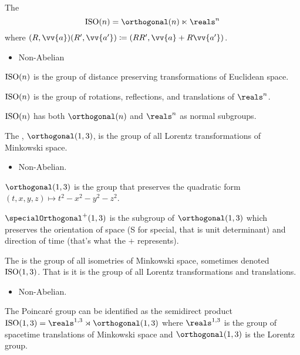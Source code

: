 \begin{dfn}{}{}
    The 
    \begin{equation}
        \ISO(n) = \orthogonal(n) \ltimes \reals^n
    \end{equation}
    where \((R, \vv{a}) (R', \vv{a'}) \coloneqq (RR', \vv{a} + R\vv{a'})\).
    \begin{multicols}{2}
        \begin{itemize}
            \item Non-Abelian
        \end{itemize}
    \end{multicols}
    \(\operatorname{ISO}(n)\) is the group of distance preserving transformations of Euclidean space.
    
    \(\operatorname{ISO}(n)\) is the group of rotations, reflections, and translations of \(\reals^n\).
    
    \(\operatorname{ISO}(n)\) has both \(\orthogonal(n)\) and \(\reals^n\) as normal subgroups.
\end{dfn}

\begin{dfn}{}{}
    The , \(\orthogonal(1, 3)\), is the group of all Lorentz transformations of Minkowski space.
    \begin{multicols}{2}
        \begin{itemize}
            \item Non-Abelian.
        \end{itemize}
    \end{multicols}

    \(\orthogonal(1, 3)\) is the group that preserves the quadratic form \((t, x, y, z) \mapsto t^2 - x^2 - y^2 - z^2\).
    
    \(\specialOrthogonal^+(1, 3)\) is the subgroup of \(\orthogonal(1, 3)\) which preserves the orientation of space (S for special, that is unit determinant) and direction of time (that's what the \(+\) represents).
\end{dfn}

\begin{dfn}{}{}
    The  is the group of all isometries of Minkowski space, sometimes denoted \(\operatorname{ISO}(1, 3)\).
    That is it is the group of all Lorentz transformations and translations.
    \begin{multicols}{2}
        \begin{itemize}
            \item Non-Abelian.
        \end{itemize}
    \end{multicols}
    
    The Poincar\'e group can be identified as the semidirect product \(\isometry(1, 3) = \reals^{1,3} \rtimes  \orthogonal(1, 3)\) where \(\reals^{1,3}\) is the group of spacetime translations of Minkowski space and \(\orthogonal(1, 3)\) is the Lorentz group.
\end{dfn}
